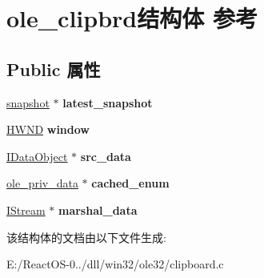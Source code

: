 \hypertarget{structole__clipbrd}{}\section{ole\+\_\+clipbrd结构体 参考}
\label{structole__clipbrd}
\subsection*{Public 属性}
\begin{DoxyCompactItemize}
\item 
\mbox{\label{structole__clipbrd_a1e0a69b151e4ae4c69a431f68c024e41}} 
\hyperlink{structsnapshot}{snapshot} $\ast$ {\bfseries latest\+\_\+snapshot}
\item 
\mbox{\label{structole__clipbrd_a03bdc6c9a26a2646379342b0cf8fadf8}} 
\hyperlink{interfacevoid}{H\+W\+ND} {\bfseries window}
\item 
\mbox{\label{structole__clipbrd_a60f6d5c352dc59cab2b2c8c75e06b56b}} 
\hyperlink{interface_i_data_object}{I\+Data\+Object} $\ast$ {\bfseries src\+\_\+data}
\item 
\mbox{\label{structole__clipbrd_a4e24578300e2e278d27bf7e619b07045}} 
\hyperlink{structole__priv__data}{ole\+\_\+priv\+\_\+data} $\ast$ {\bfseries cached\+\_\+enum}
\item 
\mbox{\label{structole__clipbrd_a2d455f2b69a5e4df459fd613b3de29c9}} 
\hyperlink{interface_i_stream}{I\+Stream} $\ast$ {\bfseries marshal\+\_\+data}
\end{DoxyCompactItemize}


该结构体的文档由以下文件生成\+:\begin{DoxyCompactItemize}
\item 
E\+:/\+React\+O\+S-\/0../dll/win32/ole32/clipboard.\+c\end{DoxyCompactItemize}
